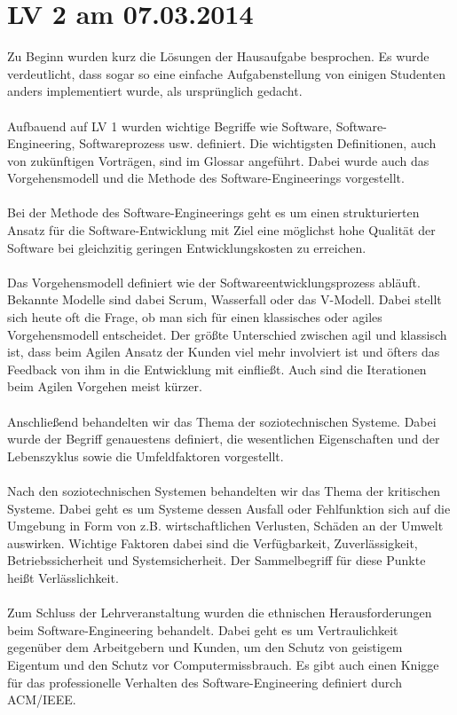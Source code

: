\chapter{LV 2 am 07.03.2014}
Zu Beginn wurden kurz die Lösungen der Hausaufgabe besprochen. Es wurde verdeutlicht, dass sogar so eine einfache Aufgabenstellung von einigen Studenten anders implementiert wurde, als ursprünglich gedacht.
\\\\
Aufbauend auf LV 1 wurden wichtige Begriffe wie Software, Software-Engineering, Softwareprozess usw. definiert. Die wichtigsten Definitionen, auch von zukünftigen Vorträgen, sind im Glossar angeführt. Dabei wurde auch das Vorgehensmodell und die Methode des Software-Engineerings vorgestellt.
\\\\
Bei der Methode des Software-Engineerings geht es um einen strukturierten Ansatz für die Software-Entwicklung mit Ziel eine möglichst hohe Qualität der Software bei gleichzitig geringen Entwicklungskosten zu erreichen.
\\\\
Das Vorgehensmodell definiert wie der Softwareentwicklungsprozess abläuft. Bekannte Modelle sind dabei Scrum, Wasserfall oder das V-Modell. Dabei stellt sich heute oft die Frage, ob man sich für einen klassisches oder agiles Vorgehensmodell entscheidet. Der größte Unterschied zwischen agil und klassisch ist, dass beim Agilen Ansatz der Kunden viel mehr involviert ist und öfters das Feedback von ihm in die Entwicklung mit einfließt. Auch sind die Iterationen beim Agilen Vorgehen meist kürzer.
\\\\
Anschließend behandelten wir das Thema der soziotechnischen Systeme. Dabei wurde der Begriff genauestens definiert, die wesentlichen Eigenschaften und der Lebenszyklus sowie die Umfeldfaktoren vorgestellt.
\\\\
Nach den soziotechnischen Systemen behandelten wir das Thema der kritischen Systeme. Dabei geht es um Systeme dessen Ausfall oder Fehlfunktion sich auf die Umgebung in Form von z.B. wirtschaftlichen Verlusten, Schäden an der Umwelt  auswirken. Wichtige Faktoren dabei sind die Verfügbarkeit, Zuverlässigkeit, Betriebssicherheit und Systemsicherheit. Der Sammelbegriff für diese Punkte heißt Verlässlichkeit.
\\\\
Zum Schluss der Lehrveranstaltung wurden die ethnischen Herausforderungen beim Software-Engineering behandelt. Dabei geht es um Vertraulichkeit gegenüber dem Arbeitgebern und Kunden, um den Schutz von geistigem Eigentum und den Schutz vor Computermissbrauch. Es gibt auch einen Knigge für das professionelle Verhalten des Software-Engineering definiert durch ACM/IEEE.